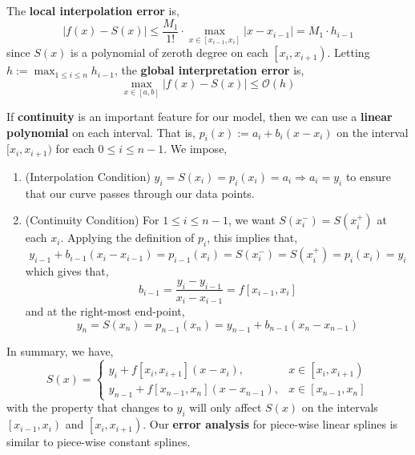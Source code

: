 \begin{rmk}
    The \textbf{local interpolation error} is,
    \[|f(x)-S(x)| \leq \frac{M_1}{1 !} \cdot \max _{x \in\left[x_{i-1}, x_i\right]}\left|x-x_{i-1}\right|=M_1 \cdot h_{i-1}\]
    since $S(x)$ is a polynomial of zeroth degree on each $\left[x_i, x_{i+1}\right)$. Letting $h:=\max _{1 \leq i \leq n} h_{i-1}$, the \textbf{global interpretation error} is,
    \[\max _{x \in[a, b]}|f(x)-S(x)| \leq \mathcal{O}(h)\]
\end{rmk}

\LineBreak

\noindent If \textbf{continuity} is an important feature for our model, then we can use a \textbf{linear polynomial} on each interval. That is, $p_i(x) := a_i+b_i\left(x-x_i\right)$ on the interval $[x_i, x_{i+1})$ for each $0 \leq i \leq n-1$. We impose,
\begin{enumerate}
    \item (Interpolation Condition) $y_i=S\left(x_i\right)=p_i\left(x_i\right)=a_i \Rightarrow a_i=y_i$ to ensure that our curve passes through our data points.
    \item (Continuity Condition) For $1 \leq i \leq n - 1$, we want $S\left(x_i^{-}\right)=S\left(x_i^{+}\right)$ at each $x_i$. Applying the definition of $p_i$, this implies that,
    \[y_{i-1}+b_{i-1}\left(x_i-x_{i-1}\right)=p_{i-1}\left(x_i\right)=S\left(x_i^{-}\right)=S\left(x_i^{+}\right)=p_i\left(x_i\right)=y_i\]
    which gives that,
    \[b_{i-1}=\frac{y_i-y_{i-1}}{x_i-x_{i-1}}=f\left[x_{i-1}, x_i\right]\]
    and at the right-most end-point,
    \[y_n=S\left(x_n\right)=p_{n-1}\left(x_n\right)=y_{n-1}+b_{n-1}\left(x_n-x_{n-1}\right)\]
\end{enumerate}
In summary, we have,
\[S(x)= \begin{cases}y_i+f\left[x_i, x_{i+1}\right]\left(x-x_i\right), & x \in\left[x_i, x_{i+1}\right) \\ y_{n-1}+f\left[x_{n-1}, x_n\right]\left(x-x_{n-1}\right), & x \in\left[x_{n-1}, x_n\right]\end{cases}\]
with the property that changes to $y_i$ will only affect $S(x)$ on the intervals $\left[x_{i-1}, x_i\right)$ and $\left[x_i, x_{i+1}\right)$. Our \textbf{error analysis} for piece-wise linear splines is similar to piece-wise constant splines.

